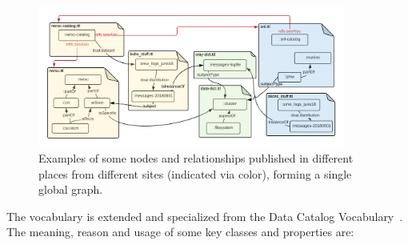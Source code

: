 \begin{figure}
\includegraphics[width=0.9\textwidth]{logset-example.png}
\caption{Examples of some nodes and relationships published in different places 
from different sites (indicated via color), forming a single global graph. }
\label{f:logset-example}
\end{figure}

The vocabulary is extended and specialized 
from the Data Catalog Vocabulary~\cite{DCAT}. The meaning, 
reason and usage of some key classes and properties are:

